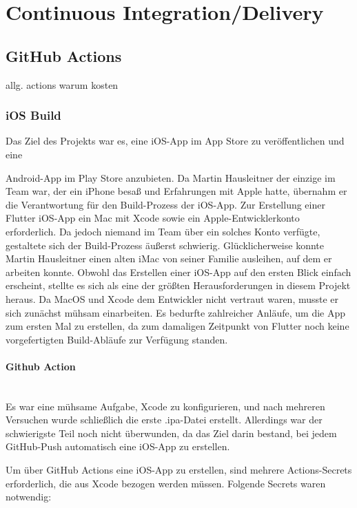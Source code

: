 \section{Continuous Integration/Delivery}
\subsection{GitHub Actions}

allg. actions warum kosten
\subsubsection{iOS Build}  Das
Ziel des Projekts war es, eine \cite{ios_app_store} iOS-App
im App Store zu veröffentlichen und eine


Android-App im Play Store anzubieten. Da Martin Hausleitner der einzige im Team war, der ein iPhone besaß und Erfahrungen mit Apple hatte, übernahm er die Verantwortung für den Build-Prozess der iOS-App.
Zur Erstellung einer \cite{flutter} Flutter iOS-App ein Mac mit \cite{xcode} Xcode sowie ein \cite{apple_developer_program} Apple-Entwicklerkonto erforderlich. Da jedoch niemand im Team über ein solches Konto verfügte, gestaltete sich der Build-Prozess äußerst schwierig. Glücklicherweise konnte Martin Hausleitner einen alten iMac von seiner Familie ausleihen, auf dem er arbeiten konnte. Obwohl das Erstellen einer iOS-App auf den ersten Blick einfach erscheint, stellte es sich als eine der größten Herausforderungen in diesem Projekt heraus.
Da MacOS und Xcode dem Entwickler nicht vertraut waren, musste er sich zunächst mühsam einarbeiten. Es bedurfte zahlreicher Anläufe, um die App zum ersten Mal zu erstellen, da zum damaligen Zeitpunkt von Flutter noch keine vorgefertigten Build-Abläufe zur Verfügung standen.


\paragraph{Github Action}\mbox{} \\
Es war eine mühsame Aufgabe, Xcode zu konfigurieren, und
nach mehreren Versuchen wurde schließlich die erste
.ipa-Datei erstellt. Allerdings war der schwierigste Teil
noch nicht überwunden, da das Ziel darin bestand, bei jedem
GitHub-Push automatisch eine iOS-App zu erstellen.

Um über GitHub Actions eine iOS-App zu erstellen, sind
mehrere Actions-Secrets erforderlich, die aus Xcode bezogen
werden müssen. Folgende Secrets waren notwendig:

